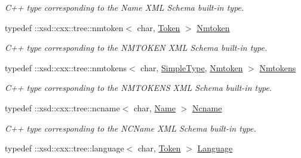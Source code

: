\begin{DoxyCompactItemize}
\begin{DoxyCompactList}\small\item\em C++ type corresponding to the Name XML Schema built-\/in type. \item\end{DoxyCompactList}\item 
\hypertarget{namespacexml__schema_aff77acdf25cb3f0e2bee25436470dfa8}{
typedef ::xsd::cxx::tree::nmtoken$<$ char, \hyperlink{namespacexml__schema_a6c5a46363a79f52c8f09edc7885e259c}{Token} $>$ \hyperlink{namespacexml__schema_aff77acdf25cb3f0e2bee25436470dfa8}{Nmtoken}}
\label{namespacexml__schema_aff77acdf25cb3f0e2bee25436470dfa8}

\begin{DoxyCompactList}\small\item\em C++ type corresponding to the NMTOKEN XML Schema built-\/in type. \item\end{DoxyCompactList}\item 
\hypertarget{namespacexml__schema_aa8453d4c59fcb01552ceeaf49de9da76}{
typedef ::xsd::cxx::tree::nmtokens$<$ char, \hyperlink{namespacexml__schema_a1171be9b6e593e49b895a46671f5dc5f}{SimpleType}, \hyperlink{namespacexml__schema_aff77acdf25cb3f0e2bee25436470dfa8}{Nmtoken} $>$ \hyperlink{namespacexml__schema_aa8453d4c59fcb01552ceeaf49de9da76}{Nmtokens}}
\label{namespacexml__schema_aa8453d4c59fcb01552ceeaf49de9da76}

\begin{DoxyCompactList}\small\item\em C++ type corresponding to the NMTOKENS XML Schema built-\/in type. \item\end{DoxyCompactList}\item 
\hypertarget{namespacexml__schema_aceb9a08fa292b3b3af49f5aa42d06fa9}{
typedef ::xsd::cxx::tree::ncname$<$ char, \hyperlink{namespacexml__schema_af4febacaa19a36f5a1caab58e620f6d5}{Name} $>$ \hyperlink{namespacexml__schema_aceb9a08fa292b3b3af49f5aa42d06fa9}{Ncname}}
\label{namespacexml__schema_aceb9a08fa292b3b3af49f5aa42d06fa9}

\begin{DoxyCompactList}\small\item\em C++ type corresponding to the NCName XML Schema built-\/in type. \item\end{DoxyCompactList}\item 
\hypertarget{namespacexml__schema_ae32771888035aa186f9432f7e791b0f1}{
typedef ::xsd::cxx::tree::language$<$ char, \hyperlink{namespacexml__schema_a6c5a46363a79f52c8f09edc7885e259c}{Token} $>$ \hyperlink{namespacexml__schema_ae32771888035aa186f9432f7e791b0f1}{Language}}
\label{namespacexml__schema_ae32771888035aa186f9432f7e791b0f1}


\end{DoxyCompactItemize}
